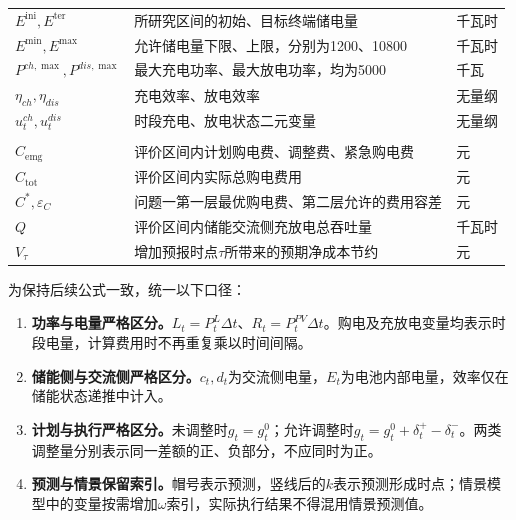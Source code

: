 \documentclass[UTF8,a4paper,12pt,fontset=fandol]{ctexart}
\numberwithin{equation}{section}
\begin{document}
\begin{longtable}{>{\raggedright\arraybackslash}p{}>{\raggedright\arraybackslash}p{}>{\raggedright\arraybackslash}p{}}
$E^{\mathrm{ini}},E^{\mathrm{ter}}$ & 所研究区间的初始、目标终端储电量 & 千瓦时\\
$E^{\min},E^{\max}$ & 允许储电量下限、上限，分别为1200、10800 & 千瓦时\\
$P^{ch,\max},P^{dis,\max}$ & 最大充电功率、最大放电功率，均为5000 & 千瓦\\
$\eta_{ch},\eta_{dis}$ & 充电效率、放电效率 & 无量纲\\
$u_t^{ch},u_t^{dis}$ & 时段充电、放电状态二元变量 & 无量纲\\
\shortstack[l]{$C_{\mathrm{plan}},C_{\mathrm{adj}}$\\$C_{\mathrm{emg}}$} & 评价区间内计划购电费、调整费、紧急购电费 & 元\\
$C_{\mathrm{tot}}$ & 评价区间内实际总购电费用 & 元\\
$C^*,\varepsilon_C$ & 问题一第一层最优购电费、第二层允许的费用容差 & 元\\
$Q$ & 评价区间内储能交流侧充放电总吞吐量 & 千瓦时\\
$V_\tau$ & 增加预报时点$\tau$所带来的预期净成本节约 & 元\\
\end{longtable}
\endgroup

为保持后续公式一致，统一以下口径：
\begin{enumerate}
\item \textbf{功率与电量严格区分。}$L_t=P_t^L\Delta t$、$R_t=P_t^{PV}\Delta t$。购电及充放电变量均表示时段电量，计算费用时不再重复乘以时间间隔。
\item \textbf{储能侧与交流侧严格区分。}$c_t,d_t$为交流侧电量，$E_t$为电池内部电量，效率仅在储能状态递推中计入。
\item \textbf{计划与执行严格区分。}未调整时$g_t=g_t^0$；允许调整时$g_t=g_t^0+\delta_t^+-\delta_t^-$。两类调整量分别表示同一差额的正、负部分，不应同时为正。
\item \textbf{预测与情景保留索引。}帽号表示预测，竖线后的$k$表示预测形成时点；情景模型中的变量按需增加$\omega$索引，实际执行结果不得混用情景预测值。
\end{enumerate}

\end{document}
